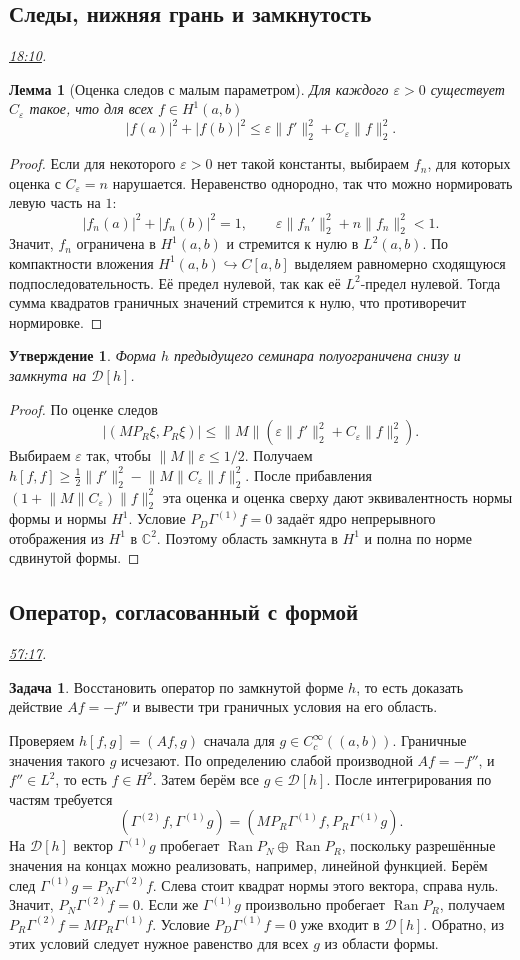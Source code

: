 \documentclass[11pt,a4paper]{article}
\theoremstyle{plain}
\newtheorem{lemma}[theorem]{Лемма}
\newtheorem{proposition}[theorem]{Утверждение}
\theoremstyle{definition}
\newtheorem{exercise}[theorem]{Задача}
\newcommand{\CC}{\mathbb C}
\newcommand{\Dom}{\mathcal D}
\newcommand{\abs}[1]{\lvert#1\rvert}
\newcommand{\norm}[1]{\lVert#1\rVert}
\newcommand{\sch}[1]{C_c^\infty(#1)}
\DeclareMathOperator{\Ran}{Ran}
\newcommand{\at}[3]{\href{https://www.youtube.com/watch?v=#1&t=#2s}{#3}}
\newcommand{\topic}[2]{\Needspace{5\baselineskip}\subsection*{#1}\noindent\emph{#2.}\par\nobreak\smallskip}
\begin{document}
\topic{Следы, нижняя грань и замкнутость}{\at{Whuc-LrLTZ0}{1090}{18:10}}
\begin{lemma}[Оценка следов с малым параметром]
Для каждого $\varepsilon>0$ существует $C_\varepsilon$
такое, что для всех $f\in H^1(a,b)$
\[
 \abs{f(a)}^2+\abs{f(b)}^2
 \le \varepsilon\norm{f'}_2^2+C_\varepsilon\norm f_2^2 .
\]
\end{lemma}
\begin{proof}
Если для некоторого $\varepsilon>0$ нет такой
константы, выбираем $f_n$, для которых оценка с
$C_\varepsilon=n$ нарушается. Неравенство однородно,
так что можно нормировать левую часть на $1$:
\[
 |f_n(a)|^2+|f_n(b)|^2=1,\qquad
 \varepsilon\norm{f_n'}_2^2+n\norm{f_n}_2^2<1.
\]
Значит, $f_n$ ограничена в $H^1(a,b)$ и стремится
к нулю в $L^2(a,b)$. По компактности вложения
$H^1(a,b)\hookrightarrow C[a,b]$ выделяем
равномерно сходящуюся подпоследовательность.
Её предел нулевой, так как её $L^2$-предел нулевой.
Тогда сумма квадратов граничных значений стремится
к нулю, что противоречит нормировке.
\end{proof}
\begin{proposition}
Форма $h$ предыдущего семинара полуограничена снизу
и замкнута на $\Dom[h]$.
\end{proposition}
\begin{proof}
По оценке следов
\[
 |(M P_R\xi,P_R\xi)|\le
 \norm M(\varepsilon\norm{f'}_2^2+C_\varepsilon\norm f_2^2).
\]
Выбираем $\varepsilon$ так, чтобы
$\norm M\varepsilon\le1/2$. Получаем
$h[f,f]\ge\tfrac12\norm{f'}_2^2-\norm M C_\varepsilon\norm f_2^2$.
После прибавления $(1+\norm M C_\varepsilon)\norm f_2^2$
эта оценка и оценка сверху дают эквивалентность
нормы формы и нормы $H^1$. Условие
$P_D\Gamma^{(1)}f=0$ задаёт ядро непрерывного
отображения из $H^1$ в $\CC^2$. Поэтому область
замкнута в $H^1$ и полна по норме сдвинутой формы.
\end{proof}

\topic{Оператор, согласованный с формой}{\at{Whuc-LrLTZ0}{3437}{57:17}}
\begin{exercise}
Восстановить оператор по замкнутой форме $h$,
то есть доказать действие $Af=-f''$ и вывести
три граничных условия на его область.
\end{exercise}
Проверяем $h[f,g]=(Af,g)$ сначала для $g\in\sch{(a,b)}$.
Граничные значения такого $g$ исчезают. По определению
слабой производной $Af=-f''$, и $f''\in L^2$, то есть
$f\in H^2$. Затем берём все $g\in\Dom[h]$. После
интегрирования по частям требуется
\[
 (\Gamma^{(2)}f,\Gamma^{(1)}g)
      =(M P_R\Gamma^{(1)}f,P_R\Gamma^{(1)}g).
\]
На $\Dom[h]$ вектор $\Gamma^{(1)}g$ пробегает
$\Ran P_N\oplus\Ran P_R$, поскольку разрешённые значения
на концах можно реализовать, например, линейной функцией.
Берём след $\Gamma^{(1)}g=P_N\Gamma^{(2)}f$.
Слева стоит квадрат нормы этого вектора, справа
нуль. Значит, $P_N\Gamma^{(2)}f=0$. Если же
$\Gamma^{(1)}g$ произвольно пробегает $\Ran P_R$,
получаем $P_R\Gamma^{(2)}f=M P_R\Gamma^{(1)}f$.
Условие $P_D\Gamma^{(1)}f=0$ уже входит в $\Dom[h]$.
Обратно, из этих условий следует нужное равенство для всех
$g$ из области формы.
\end{document}
